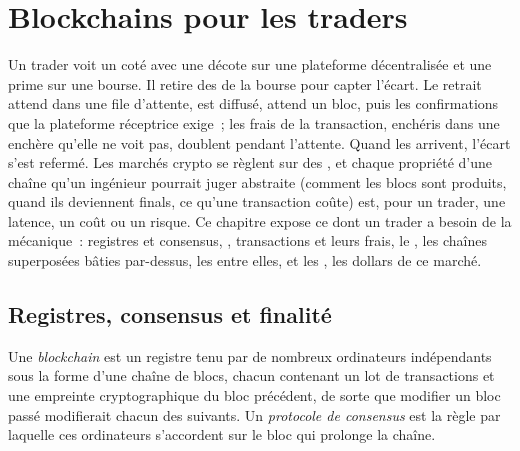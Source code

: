 \chapter{Blockchains pour les traders}\label{ch:m3:blockchains-for-traders}

Un trader voit un  coté avec une décote sur une plateforme décentralisée et une prime sur une
bourse. Il retire des  de la bourse pour capter l'écart. Le retrait attend dans une
file d'attente, est diffusé, attend un bloc, puis les confirmations que la plateforme réceptrice exige~;
les frais de la transaction, enchéris dans une enchère qu'elle ne voit pas, doublent pendant l'attente. Quand les 
arrivent, l'écart s'est refermé. Les marchés crypto se règlent sur des , et chaque propriété d'une chaîne
qu'un ingénieur pourrait juger abstraite (comment les blocs sont produits, quand ils deviennent finals, ce qu'une transaction
coûte) est, pour un trader, une latence, un coût ou un risque. Ce chapitre expose ce dont un trader a besoin de
la mécanique~: registres et consensus, , transactions et leurs frais, le , les
chaînes superposées bâties par-dessus, les  entre elles, et les , les dollars de ce marché.

\section{Registres, consensus et finalité}

\begin{definition}\label{def:m3:blockchains-for-traders:chain}
Une \emph{blockchain} est un registre tenu par de nombreux ordinateurs indépendants sous la forme d'une chaîne de
blocs, chacun contenant un lot de transactions et une empreinte cryptographique du bloc précédent, de sorte que
modifier un bloc passé modifierait chacun des suivants. Un
\emph{protocole de consensus} est la règle par laquelle ces ordinateurs s'accordent sur le bloc qui prolonge la chaîne.
\end{definition}


